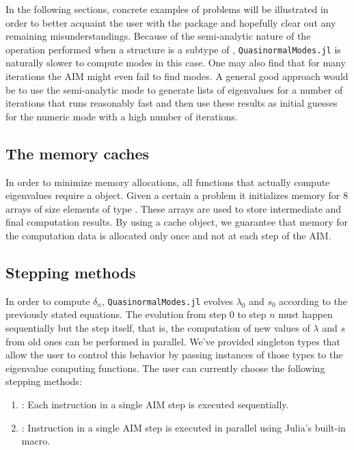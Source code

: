 In the following sections, concrete examples of problems will be illustrated in order to better acquaint the user with the package and hopefully clear out any remaining misunderstandings. Because of the semi-analytic nature of the operation performed when a structure is a subtype of , \texttt{QuasinormalModes.jl} is naturally slower to compute modes in this case. One may also find that for many iterations the AIM might even fail to find modes. A general good approach would be to use the semi-analytic mode to generate lists of eigenvalues for a number of iterations that runs reasonably fast and then use these results as initial guesses for the numeric mode with a high number of iterations.

\subsection{The memory caches}

In order to minimize memory allocations, all functions that actually compute eigenvalues require a  object. Given a certain a problem  it initializes memory for 8 arrays of size  elements of type . These arrays are used to store intermediate and final computation results. By using a cache object, we guarantee that memory for the computation data is allocated only once and not at each step of the AIM.

\subsection{Stepping methods}

In order to compute $\delta_n$, \texttt{QuasinormalModes.jl} evolves $\lambda_0$ and $s_0$ according to the previously stated equations. The evolution from step 0 to step $n$ must happen sequentially but the step itself, that is, the computation of new values of $\lambda$ and $s$ from old ones can be performed in parallel. We've provided singleton types that allow the user to control this behavior by passing instances of those types to the eigenvalue computing functions. The user can currently choose the following stepping methods:
%
\begin{enumerate}
  \item {}: Each instruction in a single AIM step is executed sequentially.
  \item {}: Instruction in a single AIM step is executed in parallel using Julia's built-in  macro.
\end{enumerate}

